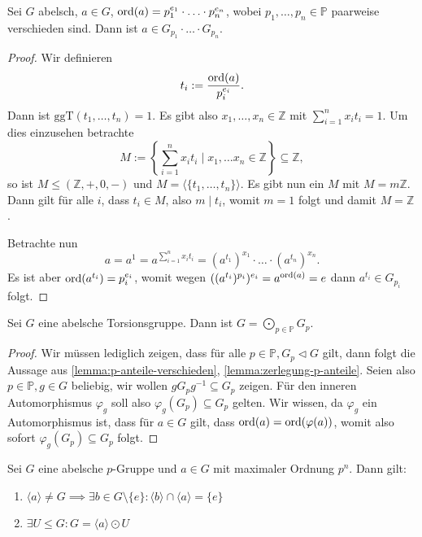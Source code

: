 \begin{lemma} \label{lemma:zerlegung-p-anteile}
    Sei $G$ abelsch, $a \in G$, $\operatorname{ord}(a) = p_1^{e_1} \cdot \hdots \cdot p_n^{e_n}$, wobei $p_1, \hdots, p_n \in \mathbb{P}$ paarweise verschieden sind. Dann ist $a \in G_{p_1} \cdot \hdots \cdot G_{p_n}$.
\end{lemma}

\begin{proof}
    Wir definieren
    $$ t_i := \frac{\operatorname{ord}(a)}{p_i^{e_i}}. $$
    Dann ist $\mathrm{ggT}(t_1, \hdots, t_n) = 1$. Es gibt also $x_1, \hdots, x_n \in \mathbb{Z}$ mit $\sum_{i=1}^n x_i t_i = 1$. Um dies einzusehen betrachte
    $$ M := \left\{ \sum_{i=1}^n x_i t_i \mid x_1, \hdots x_n \in \mathbb{Z} \right\} \subseteq \mathbb{Z}, $$
    so ist $M \leq (\mathbb{Z}, +, 0, -)$ und $M = \langle \{ t_1, \hdots, t_n \} \rangle$. Es gibt nun ein $M$ mit $M = m \mathbb{Z}$. Dann gilt für alle $i$, dass $t_i \in M$, also $m \mid t_i$, womit $m = 1$ folgt und damit $M = \mathbb{Z}$.

    Betrachte nun
    $$ a = a^1 = a^{\sum_{i=1}^n x_i t_i} = (a^{t_1})^{x_1} \cdot \hdots \cdot (a^{t_n})^{x_n}. $$
    Es ist aber $\operatorname{ord}(a^{t_i}) = p_i^{e_i}$, womit wegen $((a^{t_i})^{p_i})^{e_i} = a^{\operatorname{ord}(a)} = e$ dann $a^{t_i} \in G_{p_i}$ folgt.
\end{proof}


\begin{theorem}
    Sei $G$ eine abelsche Torsionsgruppe. Dann ist $G = \bigodot_{p \in \mathbb{P}} G_p$.
\end{theorem}

\begin{proof}
    Wir müssen lediglich zeigen, dass für alle $p \in \mathbb{P}, G_p \vartriangleleft G$ gilt, dann folgt die Aussage aus \cref{lemma:p-anteile-verschieden}, \cref{lemma:zerlegung-p-anteile}. Seien also $p \in \mathbb{P}, g \in G$ beliebig, wir wollen $g G_p g^{-1} \subseteq G_p$ zeigen. Für den inneren Automorphismus $\varphi_g$ soll also $\varphi_g(G_p) \subseteq G_p$ gelten. Wir wissen, da $\varphi_g$ ein Automorphismus ist, dass für $a \in G$ gilt, dass $\operatorname{ord}(a) = \operatorname{ord}(\varphi(a))$, womit also sofort $\varphi_g(G_p) \subseteq G_p$ folgt.
\end{proof}

\begin{lemma}
    Sei $G$ eine abelsche $p$-Gruppe und $a \in G$ mit maximaler Ordnung $p^n$. Dann gilt:
    \begin{enumerate}
        \item $\langle a \rangle \neq G \implies \exists b \in G \setminus \{ e \} : \langle b \rangle \cap \langle a \rangle = \{ e \}$
        \item $\exists U \leq G: G = \langle a \rangle \odot U$
    \end{enumerate}
\end{lemma}

